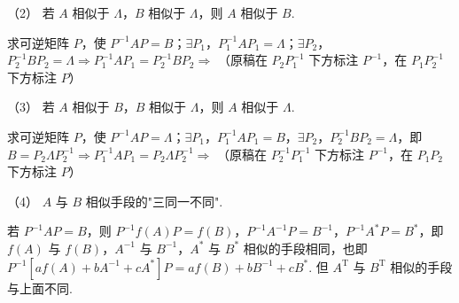 \begin{fcard}{（2）}
若 $A$ 相似于 $\Lambda$，$B$ 相似于 $\Lambda$，则 $A$ 相似于 $B$.

求可逆矩阵 $P$，使 $P^{-1}AP=B$；$\exists P_1$，$P_1^{-1}AP_1=\Lambda$；$\exists P_2$，$P_2^{-1}BP_2=\Lambda\Rightarrow P_1^{-1}AP_1=P_2^{-1}BP_2\Rightarrow$
（原稿在 $P_2P_1^{-1}$ 下方标注 $P^{-1}$，在 $P_1P_2^{-1}$ 下方标注 $P$）
\end{fcard}

\begin{fcard}{（3）}
若 $A$ 相似于 $B$，$B$ 相似于 $\Lambda$，则 $A$ 相似于 $\Lambda$.

求可逆矩阵 $P$，使 $P^{-1}AP=\Lambda$；$\exists P_1$，$P_1^{-1}AP_1=B$，$\exists P_2$，$P_2^{-1}BP_2=\Lambda$，即 $B=P_2\Lambda P_2^{-1}\Rightarrow P_1^{-1}AP_1=P_2\Lambda P_2^{-1}\Rightarrow$
（原稿在 $P_2^{-1}P_1^{-1}$ 下方标注 $P^{-1}$，在 $P_1P_2$ 下方标注 $P$）
\end{fcard}

\begin{fcard}{（4）}
$A$ 与 $B$ 相似手段的"三同一不同".

若 $P^{-1}AP=B$，则 $P^{-1}f(A)P=f(B)$，$P^{-1}A^{-1}P=B^{-1}$，$P^{-1}A^{*}P=B^{*}$，即 $f(A)$ 与 $f(B)$，$A^{-1}$ 与 $B^{-1}$，$A^{*}$ 与 $B^{*}$ 相似的手段相同，也即 $P^{-1}[af(A)+bA^{-1}+cA^{*}]P=af(B)+bB^{-1}+cB^{*}$. 但 $A^{\mathrm T}$ 与 $B^{\mathrm T}$ 相似的手段与上面不同.
\end{fcard}

